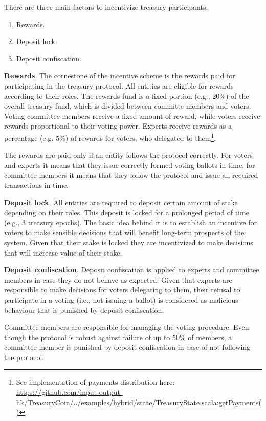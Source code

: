 There are three main factors to incentivize treasury participants:
\begin{enumerate}
	\item Rewards.
	\item Deposit lock.
	\item Deposit confiscation.
\end{enumerate}

\textbf{Rewards}. The cornestone of the incentive scheme is the rewards paid for participating in the treasury protocol. All entities are eligible for rewards according to their roles. The rewards fund is a fixed portion (e.g., 20\%) of the overall treasury fund, which is divided between committe members and voters. Voting committee members receive a fixed amount of reward, while voters receive rewards proportional to their voting power. Experts receive rewards as a percentage (e.g. 5\%) of rewards for voters, who delegated to them\footnote{See implementation of payments distribution here:\\ \href{https://github.com/input-output-hk/TreasuryCoin/blob/master/examples/src/main/scala/examples/hybrid/state/TreasuryState.scala\#L537}{https://github.com/input-output-hk/TreasuryCoin/../examples/hybrid/state/TreasuryState.scala:getPayments()}}.

The rewards are paid only if an entity follows the protocol correctly. For voters and experts it means that they issue correctly formed voting ballots in time; for committee members it means that they follow the protocol and issue all required transactions in time.

\textbf{Deposit lock}. All entities are required to deposit certain amount of stake depending on their roles. This deposit is locked for a prolonged period of time (e.g., 3 treasury epochs). The basic idea behind it is to establish an incentive for voters to make sensible decisions that will benefit long-term prospects of the system. Given that their stake is locked they are incentivized to make decisions that will increase value of their stake.

\textbf{Deposit confiscation}. Deposit confiscation is applied to experts and committee members in case they do not behave as expected. Given that experts are responsible to make decisions for voters delegating to them, their refusal to participate in a voting (i.e., not issuing a ballot) is considered as malicious behaviour that is punished by deposit confiscation.

Committee members are responsible for managing the voting procedure. Even though the protocol is robust against failure of up to 50\% of members, a committee member is punished by deposit confiscation in case of not following the protocol.
